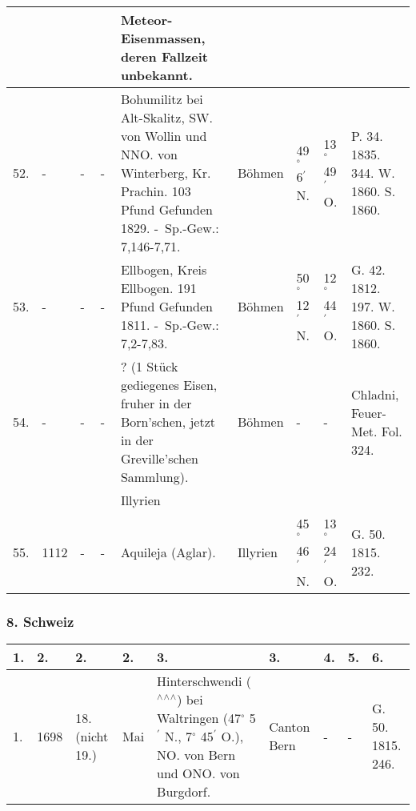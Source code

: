 \documentclass[a4paper, 8pt, oneside, polutonikogreek, german]{article}
\begin{document}
\begin{center}
\begin{longtable}{|p{3mm}|p{10mm}|p{5mm}|p{13mm}|p{25mm}|p{13mm}|p{10mm}|p{10mm}|p{11mm}|}
          &   &   &   & Meteor-Eisenmassen, deren Fallzeit unbekannt. &   &   &   & ~ \\ \hline
        52. & - & - & - & Bohumilitz bei Alt-Skalitz, SW. von Wollin und NNO. von Winterberg, Kr. Prachin. 103 Pfund Gefunden 1829. - Sp.-Gew.: 7,146-7,71. & Böhmen & 49$^\circ$ 6$^\prime$ N. & 13$^\circ$ 49$^\prime$ O. & P. 34. 1835. 344. W. 1860. S. 1860. \\ \hline
        53. & - & - & - & Ellbogen, Kreis Ellbogen. 191 Pfund Gefunden 1811. - Sp.-Gew.: 7,2-7,83. & Böhmen & 50$^\circ$ 12$^\prime$ N. & 12$^\circ$ 44$^\prime$ O. & G. 42. 1812. 197. W. 1860. S. 1860. \\ \hline
        54. & - & - & - & ? (1 Stück gediegenes Eisen, fruher in der Born’schen, jetzt in der Greville’schen Sammlung). & Böhmen & - & - & Chladni, Feuer-Met. Fol. 324. \\ \hline
         &   &   &  & Illyrien &   &   &   &   \\ \hline
        55. & 1112 & - & - & Aquileja (Aglar). & Illyrien & 45$^\circ$ 46$^\prime$ N. & 13$^\circ$ 24$^\prime$ O. & G. 50. 1815. 232. \\ \hline
    \end{longtable}
\end{center}
\subsubsection{8. Schweiz}
\begin{table}[H]
    \footnotesize
    \begin{tabular}{|p{3mm}|p{10mm}|p{5mm}|p{13mm}|p{25mm}|p{13mm}|p{10mm}|p{10mm}|p{11mm}|}
    \hline
        1. & 2. & 2. & 2. & 3. & 3. & 4. & 5. & 6. \\ \hline
        1. & 1698 & 18. (nicht 19.) & Mai & Hinterschwendi ($^\wedge$$^\wedge$$^\wedge$) bei Waltringen (47$^\circ$ 5$^\prime$ N., 7$^\circ$ 45$^\prime$ O.), NO. von Bern und ONO. von Burgdorf. & Canton Bern & - & - & G. 50. 1815. 246. \\ \hline
    \end{tabular}
\end{table}
\end{document}
